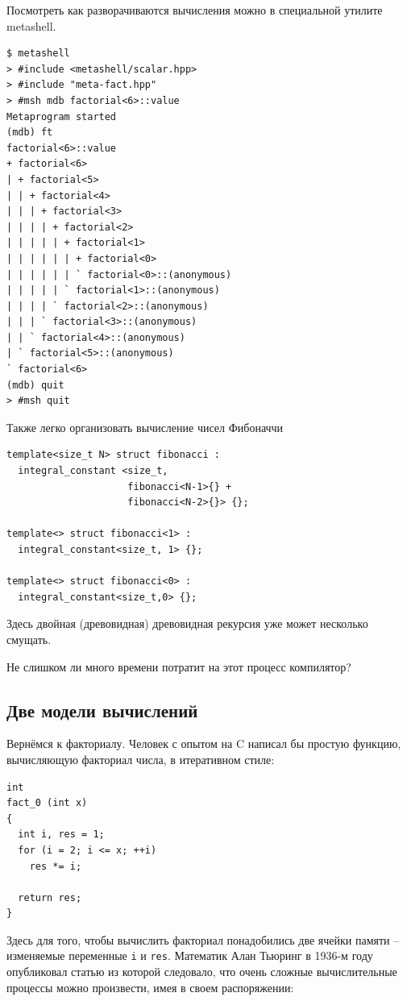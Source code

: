 \documentclass[a4paper,12pt,oneside]{book}
\begin{document}
Посмотреть как разворачиваются вычисления можно в специальной утилите metashell.

\begin{verbatim}
$ metashell
> #include <metashell/scalar.hpp>
> #include "meta-fact.hpp"
> #msh mdb factorial<6>::value
Metaprogram started
(mdb) ft
factorial<6>::value
+ factorial<6> 
| + factorial<5> 
| | + factorial<4> 
| | | + factorial<3> 
| | | | + factorial<2> 
| | | | | + factorial<1> 
| | | | | | + factorial<0> 
| | | | | | ` factorial<0>::(anonymous) 
| | | | | ` factorial<1>::(anonymous) 
| | | | ` factorial<2>::(anonymous) 
| | | ` factorial<3>::(anonymous) 
| | ` factorial<4>::(anonymous) 
| ` factorial<5>::(anonymous) 
` factorial<6> 
(mdb) quit
> #msh quit
\end{verbatim}

Также легко организовать вычисление чисел Фибоначчи

\begin{lstlisting}
template<size_t N> struct fibonacci :
  integral_constant <size_t,
                     fibonacci<N-1>{} +
                     fibonacci<N-2>{}> {};

template<> struct fibonacci<1> : 
  integral_constant<size_t, 1> {};

template<> struct fibonacci<0> : 
  integral_constant<size_t,0> {};
\end{lstlisting}

Здесь двойная (древовидная) древовидная рекурсия уже может несколько смущать.

Не слишком ли много времени потратит на этот процесс компилятор?

\subsection{Две модели вычислений}\label{ComputationModels}

Вернёмся к факториалу. Человек с опытом на C написал бы простую функцию, вычисляющую факториал числа, в итеративном стиле:

\begin{lstlisting}
int
fact_0 (int x)
{
  int i, res = 1;
  for (i = 2; i <= x; ++i)
    res *= i;

  return res;
}
\end{lstlisting}

Здесь для того, чтобы вычислить факториал понадобились две ячейки памяти -- изменяемые переменные \lstinline!i! и \lstinline!res!. Математик Алан Тьюринг в 1936-м году опубликовал статью из которой следовало, что очень сложные вычислительные процессы можно произвести, имея в своем распоряжении:
\end{document}
